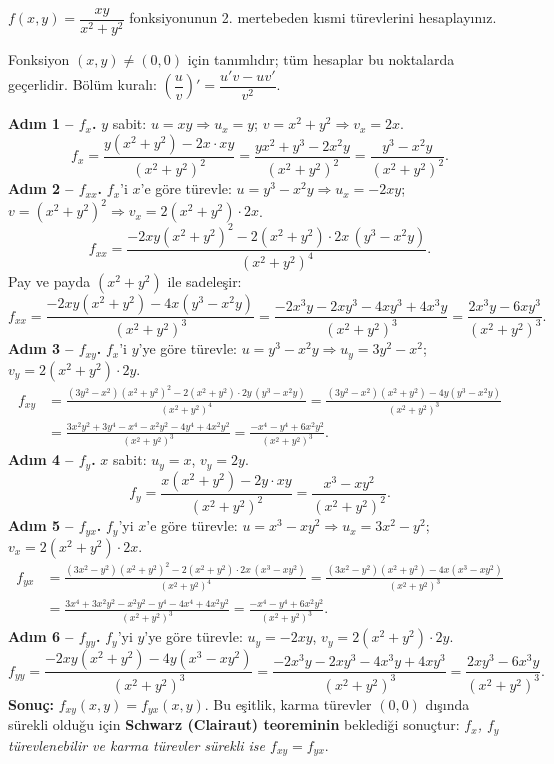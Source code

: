 \begin{soru}
$f(x,y)=\dfrac{xy}{x^2+y^2}$ fonksiyonunun 2. mertebeden kısmi türevlerini hesaplayınız.
\end{soru}
\begin{cevap}
Fonksiyon $(x,y)\ne(0,0)$ için tanımlıdır; tüm hesaplar bu noktalarda geçerlidir. Bölüm kuralı:
$\left(\dfrac uv\right)'=\dfrac{u'v-uv'}{v^2}$.

\textbf{Adım 1 -- $f_x$.} $y$ sabit: $u=xy\Rightarrow u_x=y$; $v=x^2+y^2\Rightarrow v_x=2x$.
\[
f_x=\frac{y(x^2+y^2)-2x\cdot xy}{(x^2+y^2)^2}=\frac{yx^2+y^3-2x^2y}{(x^2+y^2)^2}=\frac{y^3-x^2y}{(x^2+y^2)^2}.
\]
\textbf{Adım 2 -- $f_{xx}$.} $f_x$'i $x$'e göre türevle: $u=y^3-x^2y\Rightarrow u_x=-2xy$;
$v=(x^2+y^2)^2\Rightarrow v_x=2(x^2+y^2)\cdot2x$.
\[
f_{xx}=\frac{-2xy(x^2+y^2)^2-2(x^2+y^2)\cdot2x\,(y^3-x^2y)}{(x^2+y^2)^4}.
\]
Pay ve payda $(x^2+y^2)$ ile sadeleşir:
\[
f_{xx}=\frac{-2xy(x^2+y^2)-4x(y^3-x^2y)}{(x^2+y^2)^3}=\frac{-2x^3y-2xy^3-4xy^3+4x^3y}{(x^2+y^2)^3}
=\frac{2x^3y-6xy^3}{(x^2+y^2)^3}.
\]
\textbf{Adım 3 -- $f_{xy}$.} $f_x$'i $y$'ye göre türevle: $u=y^3-x^2y\Rightarrow u_y=3y^2-x^2$;
$v_y=2(x^2+y^2)\cdot2y$.
\begin{align*}
f_{xy}&=\frac{(3y^2-x^2)(x^2+y^2)^2-2(x^2+y^2)\cdot2y\,(y^3-x^2y)}{(x^2+y^2)^4}
=\frac{(3y^2-x^2)(x^2+y^2)-4y(y^3-x^2y)}{(x^2+y^2)^3}\\
&=\frac{3x^2y^2+3y^4-x^4-x^2y^2-4y^4+4x^2y^2}{(x^2+y^2)^3}
=\boxed{\frac{-x^4-y^4+6x^2y^2}{(x^2+y^2)^3}} .
\end{align*}
\textbf{Adım 4 -- $f_y$.} $x$ sabit: $u_y=x$, $v_y=2y$.
\[
f_y=\frac{x(x^2+y^2)-2y\cdot xy}{(x^2+y^2)^2}=\frac{x^3-xy^2}{(x^2+y^2)^2}.
\]
\textbf{Adım 5 -- $f_{yx}$.} $f_y$'yi $x$'e göre türevle: $u=x^3-xy^2\Rightarrow u_x=3x^2-y^2$; $v_x=2(x^2+y^2)\cdot2x$.
\begin{align*}
f_{yx}&=\frac{(3x^2-y^2)(x^2+y^2)^2-2(x^2+y^2)\cdot2x\,(x^3-xy^2)}{(x^2+y^2)^4}
=\frac{(3x^2-y^2)(x^2+y^2)-4x(x^3-xy^2)}{(x^2+y^2)^3}\\
&=\frac{3x^4+3x^2y^2-x^2y^2-y^4-4x^4+4x^2y^2}{(x^2+y^2)^3}
=\boxed{\frac{-x^4-y^4+6x^2y^2}{(x^2+y^2)^3}} .
\end{align*}
\textbf{Adım 6 -- $f_{yy}$.} $f_y$'yi $y$'ye göre türevle: $u_y=-2xy$, $v_y=2(x^2+y^2)\cdot2y$.
\[
f_{yy}=\frac{-2xy(x^2+y^2)-4y(x^3-xy^2)}{(x^2+y^2)^3}=\frac{-2x^3y-2xy^3-4x^3y+4xy^3}{(x^2+y^2)^3}
=\frac{2xy^3-6x^3y}{(x^2+y^2)^3}.
\]
\textbf{Sonuç:} $f_{xy}(x,y)=f_{yx}(x,y)$. Bu eşitlik, karma türevler $(0,0)$ dışında sürekli olduğu için
\textbf{Schwarz (Clairaut) teoreminin} beklediği sonuçtur: \emph{$f_x$, $f_y$ türevlenebilir ve karma türevler sürekli
ise $f_{xy}=f_{yx}$}.
\end{cevap}

